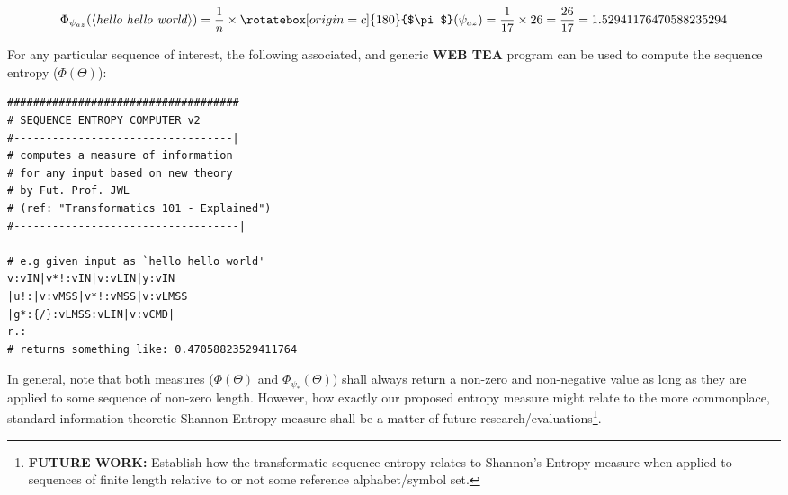 \documentclass[a4paper, 18pt]{book} %
\newcommand{\invpi}{\rotatebox[origin=c]{180}{$\pi$}}
\begin{document}
\begin{appendices}
\vspace{1em}
 \begin{equation}
\Phi_{\psi_{az}}(\langle \text{\textit{hello hello world}} \rangle) = \frac{1}{n} \times \invpi(\psi_{az}) = \frac{1}{17} \times 26 = \frac{26}{17} = 1.52941176470588235294
\end{equation}
\vspace{1em}

For any particular sequence of interest, the following associated, and generic \textbf{WEB TEA} program can be used to compute the sequence entropy ($\Phi(\Theta)$):

\vspace{2em}

  \begin{tcolorbox}[teaterminalstyle, title=TEA Program: Sequence Entropy Computer, breakable]
    \begin{lstlisting}[language=TEA,breaklines=true,label={LSTSEQENTROPY},caption=SEC in TEA]
####################################
# SEQUENCE ENTROPY COMPUTER v2
#----------------------------------|
# computes a measure of information
# for any input based on new theory
# by Fut. Prof. JWL 
# (ref: "Transformatics 101 - Explained")
#-----------------------------------|

# e.g given input as `hello hello world'
v:vIN|v*!:vIN|v:vLIN|y:vIN
|u!:|v:vMSS|v*!:vMSS|v:vLMSS
|g*:{/}:vLMSS:vLIN|v:vCMD|
r.:
# returns something like: 0.47058823529411764
   \end{lstlisting}
  \end{tcolorbox}
  \vspace{2em}


In general, note that both measures ($\Phi(\Theta)$ and $\Phi_{\psi_*}(\Theta)$) shall always return a non-zero and non-negative value as long as they are applied to some sequence of non-zero length. However, how exactly our proposed entropy measure might relate to the more commonplace, standard information-theoretic Shannon Entropy measure shall be a matter of future research/evaluations\footnote{\textbf{FUTURE WORK:} Establish how the transformatic sequence entropy relates to Shannon's Entropy measure when applied to sequences of finite length relative to or not some reference alphabet/symbol set.}.\\



\end{appendices}
\end{document}
